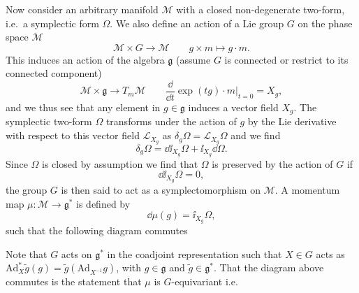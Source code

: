 Now consider an arbitrary manifold $\mathcal{M}$ with a closed non-degenerate two-form, i.e.\ a symplectic form $\Omega$. We also define an action of a Lie group $G$ on the phase space $\mathcal{M}$
\begin{equation}
    \mathcal{M}\times G\to \mathcal{M} \qquad g \times m\mapsto g\cdot m.
\end{equation}
This induces an action of the algebra $\mathfrak{g}$ (assume $G$ is connected or restrict to its connected component)
\begin{equation}
    \mathcal{M}\times \mathfrak{g} \to T_m \mathcal{M}\qquad \frac{\dd }{\dd t}\exp (tg)\cdot m|_{t=0} =X_g,
\end{equation}
and we thus see that any element in $g\in\mathfrak{g}$ induces a vector field $X_g$. The symplectic two-form $\Omega$ transforms under the action of $g$ by the Lie derivative with respect to this vector field $\mathcal{L}_{X_g}$ as $\delta_g \Omega = \mathcal{L}_{X_g}\Omega$ and we find
\begin{equation}
    \delta_g \Omega = \dd \ii_{X_g} \Omega + \ii_{X_g}\dd\Omega.
\end{equation}
Since $\Omega$ is closed by assumption we find that $\Omega$ is preserved by the action of $G$ if 
\begin{equation}
    \dd \ii_{X_g}\Omega = 0,
\end{equation}
the group $G$ is then said to act as a symplectomorphism on $\mathcal{M}$. A momentum map $\mu: \mathcal{M}\to\mathfrak{g}^*$ is defined by
\begin{equation}
    \dd \mu (g) = \ii_{X_g}\Omega,
\end{equation}
such that the following diagram commutes 
\begin{center}
\end{center}
Note that $G$ acts on $\mathfrak{g}^*$ in the coadjoint representation such that $X\in G$ acts as $\text{Ad}_X^*\tilde{g}(g)=\tilde{g}(\text{Ad}_{X^{-1}}g)$, with $g\in \mathfrak{g}$ and $\tilde{g}\in \mathfrak{g}^*$. That the diagram above commutes is the statement that $\mu$ is $G$-equivariant i.e.\
